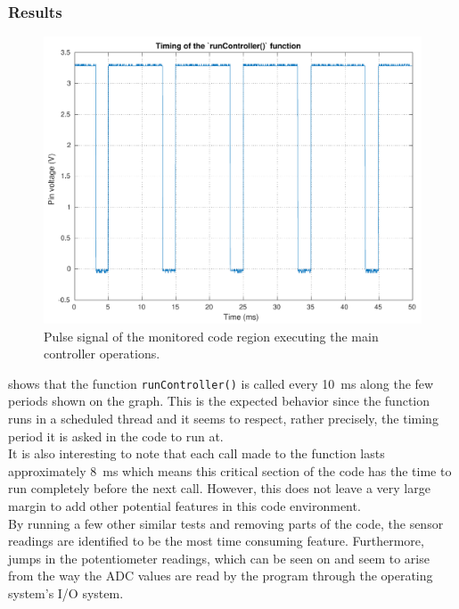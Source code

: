 \subsubsection{Results}
\begin{figure}[H]
  \centering
  \includegraphics[scale=0.6]{figures/programTiming}
  \caption{Pulse signal of the monitored code region executing the main controller operations.}
  \label{fig:programTiming}
\end{figure}
 shows that the function \lstinline{runController()} is called every \SI{10}{ms} along the few periods shown on the graph. This is the expected behavior since the function runs in a scheduled thread and it seems to respect, rather precisely, the timing period it is asked in the code to run at.\\
It is also interesting to note that each call made to the function lasts approximately \SI{8}{ms} which means this critical section of the code has the time to run completely before the next call. However, this does not leave a very large margin to add other potential features in this code environment.\\
By running a few other similar tests and removing parts of the code, the sensor readings are identified to be the most time consuming feature. Furthermore, jumps in the potentiometer readings, which can be seen on  and  seem to arise from the way the ADC values are read by the program through the operating system's I/O system. 
%
